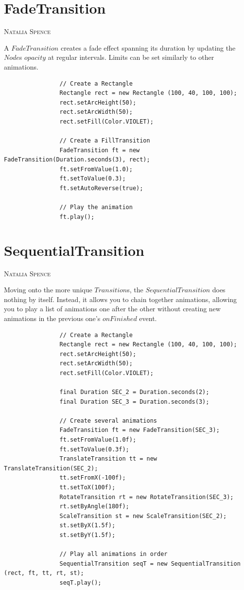 \documentclass[a4paper]{report}
\makeatletter
\newcommand{\sectionauthor}[1]{%
	{\parindent0pt\vspace*{0pt}%
		\linespread{1.1}\large\scshape#1%
		\par\nobreak\vspace*{10pt}}
	\@afterheading%
}
\makeatother
\begin{document}
		\pagebreak
			
		\section{FadeTransition}\label{sec:fade transition}
		\sectionauthor{Natalia Spence}
		
			A $FadeTransition$ creates a fade effect spanning its duration by updating the $Node$s $opacity$ at regular intervals. Limits can be set similarly to other animations.
			
			\begin{lstlisting}
				// Create a Rectangle
				Rectangle rect = new Rectangle (100, 40, 100, 100);
				rect.setArcHeight(50);
				rect.setArcWidth(50);
				rect.setFill(Color.VIOLET);
				
				// Create a FillTransition
				FadeTransition ft = new FadeTransition(Duration.seconds(3), rect);
				ft.setFromValue(1.0);
				ft.setToValue(0.3);
				ft.setAutoReverse(true);
				
				// Play the animation
				ft.play();
			\end{lstlisting}
		
		\section{SequentialTransition}\label{sec:sequential transition}
		\sectionauthor{Natalia Spence}
		
			Moving onto the more unique $Transition$s, the $SequentialTransition$ does nothing by itself. Instead, it allows you to chain together animations, allowing you to play a list of animations one after the other without creating new animations in the previous one's $onFinished$ event.
			
			\begin{lstlisting}
				// Create a Rectangle
				Rectangle rect = new Rectangle (100, 40, 100, 100);
				rect.setArcHeight(50);
				rect.setArcWidth(50);
				rect.setFill(Color.VIOLET);
				
				final Duration SEC_2 = Duration.seconds(2);
				final Duration SEC_3 = Duration.seconds(3);
				
				// Create several animations
				FadeTransition ft = new FadeTransition(SEC_3);
				ft.setFromValue(1.0f);
				ft.setToValue(0.3f);
				TranslateTransition tt = new TranslateTransition(SEC_2);
				tt.setFromX(-100f);
				tt.setToX(100f);
				RotateTransition rt = new RotateTransition(SEC_3);
				rt.setByAngle(180f);
				ScaleTransition st = new ScaleTransition(SEC_2);
				st.setByX(1.5f);
				st.setByY(1.5f);
				
				// Play all animations in order
				SequentialTransition seqT = new SequentialTransition (rect, ft, tt, rt, st);
				seqT.play();
			\end{lstlisting}
		
\end{document}
